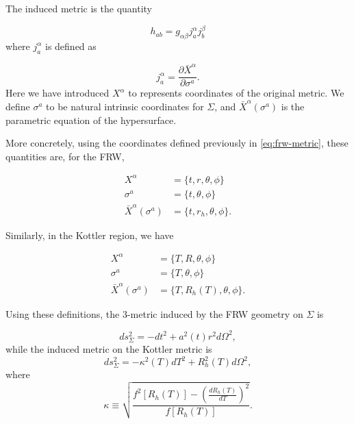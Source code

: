 The induced metric is the quantity 

\begin{equation}
  h_{ab} = g_{\alpha \beta} j^{\alpha}_{a} j^{\beta}_{b}
  \label{eq:induced-metric-defn}
\end{equation}
where $j^{\alpha}_{a}$ is defined as

\begin{equation}
  j^{\alpha}_{a} = \frac{\partial \bar{X}^{\alpha}}{\partial \sigma^a}.
  \label{eq:j-defn}
\end{equation}
Here we have introduced $X^{\alpha}$ to represents coordinates of the original metric. We define $\sigma^a$ to be natural intrinsic coordinates for $\Sigma$, and $\bar{X}^{\alpha}(\sigma^a)$ is the parametric equation of the hypersurface. 

More concretely, using the coordinates defined previously in \autoref{eq:frw-metric}, these quantities are, for the FRW, 

\begin{subequations}
  \begin{align}
    X^{\alpha} &= \{ t, r, \theta, \phi \} \\
    \sigma^a &= \{ t, \theta, \phi \} \\
    \bar{X}^{\alpha}(\sigma^a) &= \{ t, r_h, \theta, \phi\}.
  \end{align}
\end{subequations}

Similarly, in the Kottler region, we have 

\begin{subequations}
  \begin{align}
    X^{\alpha} &= \{ T, R, \theta, \phi \} \\
    \sigma^a &= \{ T, \theta, \phi \} \\
    \bar{X}^{\alpha}(\sigma^a) &= \{ T, R_h(T), \theta, \phi\}.
  \end{align}
\end{subequations}

Using these definitions, the 3-metric induced by the FRW geometry on $\Sigma$ is

\begin{equation}
  ds^2_{\Sigma} = -dt^2 + a^2(t)r^2 d \Omega^2,
  \label{eq:frw-induced-metric}
\end{equation}
while the induced metric on the Kottler metric is
\begin{equation}
  ds_{\Sigma}^2 = -\kappa^2(T)dT^2 + R_h^2(T) d \Omega^2,
  \label{eq:kottler-induced-metric}
\end{equation}
where
\begin{equation}
  \kappa \equiv \sqrt{\frac{f^2[R_h(T)] - \left(\frac{dR_h(T)}{dT}\right)^2}{f[R_h(T)]}}.
  \label{eq:kottler-kappa}
\end{equation}

